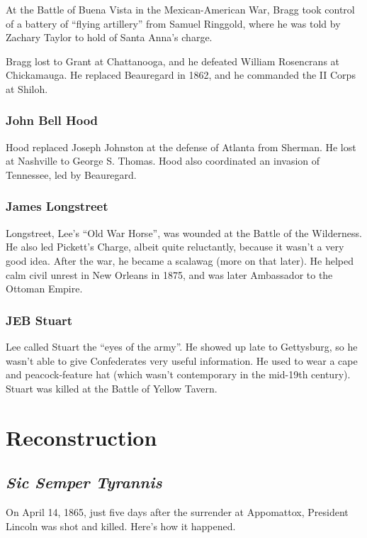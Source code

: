 At the Battle of Buena Vista in the Mexican-American War,
Bragg took control of a battery of ``flying artillery'' from Samuel Ringgold,
where he was told by Zachary Taylor to hold of Santa Anna's charge.

Bragg lost to Grant at Chattanooga, and he defeated William Rosencrans at Chickamauga.
He replaced Beauregard in 1862, and he commanded the II Corps at Shiloh.

\subsubsection*{John Bell Hood}

Hood replaced Joseph Johnston at the defense of Atlanta from Sherman.
He lost at Nashville to George S. Thomas.
Hood also coordinated an invasion of Tennessee, led by Beauregard.

\subsubsection*{James Longstreet}

Longstreet, Lee's ``Old War Horse'', was wounded at the Battle of the Wilderness.
He also led Pickett's Charge, albeit quite reluctantly, because it wasn't a very good idea.
After the war, he became a scalawag (more on that later).
He helped calm civil unrest in New Orleans in 1875, and was later Ambassador to the Ottoman Empire.

\subsubsection*{JEB Stuart}

Lee called Stuart the ``eyes of the army''.
He showed up late to Gettysburg, so he wasn't able to give Confederates very useful information.
He used to wear a cape and peacock-feature hat (which wasn't contemporary in the mid-19th century).
Stuart was killed at the Battle of Yellow Tavern.

\section{Reconstruction}

\subsection*{\textit{Sic Semper Tyrannis}}

On April 14, 1865, just five days after the surrender at Appomattox, President Lincoln was shot and killed.
Here's how it happened.


